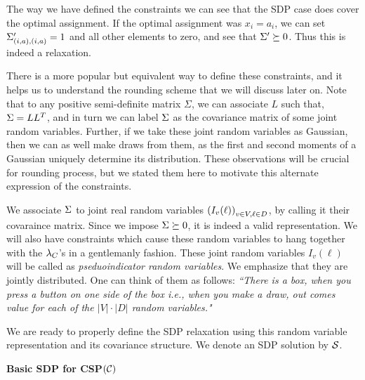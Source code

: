 \documentclass[12pt]{article}
\begin{document}
The way we have defined the constraints we can see that the SDP case does cover the optimal assignment. 
If the optimal assignment was $x_i=a_i$, we can set $ \Sigma'_{\left(i, a\right),\left(i, a\right)} = 1$ and all other elements to zero, and see that $\Sigma' \succeq 0$. 
Thus this is indeed a relaxation.


There is a more popular but equivalent way to define these constraints, and it helps us to understand the rounding scheme that we will discuss later on. 
Note that to any positive semi-definite matrix $\Sigma$, we can associate $L$ such that, $\Sigma = LL^T$, and in turn we can label $\Sigma$ as the covariance matrix of some joint random variables. 
Further, if we take these joint random variables as Gaussian, then we can as well make draws from them, as the first and second moments of a Gaussian  uniquely determine its distribution. 
These observations will be crucial for rounding process, but we stated them here to motivate this alternate expression of the constraints. 

We associate $\Sigma$ to joint real random variables $\left(I_v(\ell)\right)_{v\in V, \ell \in D}$, by calling it their covaraince matrix. Since we impose $\Sigma \succeq 0$, it is indeed a valid representation. 
We will also have constraints which cause these random variables to hang together with the $\lambda_C$'s in a gentlemanly fashion. 
These joint random variables $I_v(\ell)$ will be called as \textit{pseduoindicator random variables}. 
We emphasize that they are jointly distributed. 
One can think of them as follows: 
\textit{``There is a box, when you press a button on one side of the box i.e., when you make a draw, out comes value for each of the $|V| \cdot |D|$ random variables."}

We are ready to properly define the SDP relaxation using this random variable representation and its covariance structure.  
We denote an SDP solution by $\mathcal{S}$. 

{\bf Basic SDP for CSP$(\mathcal{C})$}  
\end{document}
